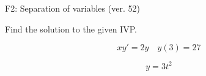 \begin{exercise}
  \begin{exerciseTitle}F2: Separation of variables (ver. 52)\end{exerciseTitle}
  \begin{exerciseStatement}
    
Find the solution to the given IVP.

    
\[xy'= 2 y \hspace{1em} y( 3 ) = 27\]

  \end{exerciseStatement}
  \begin{exerciseAnswer}
    
\[y= 3 t^ 2\]

  \end{exerciseAnswer}
\end{exercise}